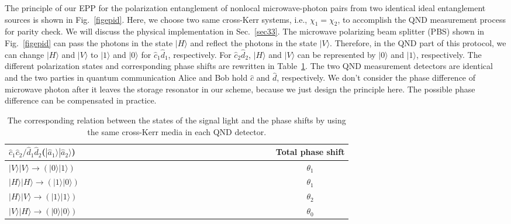 \documentclass[showpacs,aps,graphicx,twocolumn]{revtex4}
\begin{document}
The principle of our EPP for the polarization entanglement of
nonlocal microwave-photon pairs from two identical ideal
entanglement sources is shown in Fig.~\ref{figepid}. Here, we choose
two same cross-Kerr systems, i.e., $\chi_{1}=\chi_{2}$, to accomplish
the QND measurement process for parity check. We will discuss the
physical implementation in Sec.~\ref{sec33}. The microwave
polarizing beam splitter (PBS) shown in Fig.~\ref{figepid} can pass
 the  photons in the state $|H\rangle$ and reflect the
photons in the state $|V\rangle$. Therefore, in the QND part of this
protocol, we can change $|H\rangle$ and $|V\rangle$ to $|1\rangle$
and $|0\rangle$ for $\hat{c}_{1}\hat{d}_{1}$, respectively. For
$\hat{c}_{2}\hat{d}_{2}$, $|H\rangle$ and $|V\rangle$ can be
represented by $|0\rangle$ and $|1\rangle$, respectively. The
different polarization states and corresponding phase shifts are
rewritten in Table~\ref{Tab2}. The two QND measurement detectors are
identical and the two parties in quantum communication Alice and Bob
hold $\hat{c}$ and $\hat{d}$, respectively. We don't consider
the phase difference of microwave photon after it leaves the
storage resonator in our scheme, because we just design
the principle here. The possible phase difference can be
compensated in practice.





\begin{table}
\begin{center}
\caption{ The corresponding relation between the states of the
signal light and the phase shifts by using the same
cross-Kerr media in each QND detector.}
\begin{tabular}{lcccccccccccccccccccccccc}
\hline\hline
$\hat{c}_{1}\hat{c}_{2}/\hat{d}_{1}\hat{d}_{2}$($|\hat{a}_{1}\rangle|\hat{a}_{2}\rangle$)
&&&&&&&&&&&&&&&&&&&&&&&& Total phase shift  \\ \hline
$|V\rangle|V\rangle\rightarrow(|0\rangle|1\rangle)$ &&&&&&&&&&&&&&&&&&&&&&&& $\theta_{1}$  \\ %
$|H\rangle|H\rangle\rightarrow(|1\rangle|0\rangle)$ &&&&&&&&&&&&&&&&&&&&&&&& $\theta_{1}$   \\
$|H\rangle|V\rangle\rightarrow(|1\rangle|1\rangle)$ &&&&&&&&&&&&&&&&&&&&&&&& $\theta_{2}$ \\ %
$|V\rangle|H\rangle\rightarrow(|0\rangle|0\rangle)$ &&&&&&&&&&&&&&&&&&&&&&&& $\theta_{0}$ \\ \hline\hline
\end{tabular}\label{Tab2}
\end{center}
\end{table}
\end{document}
